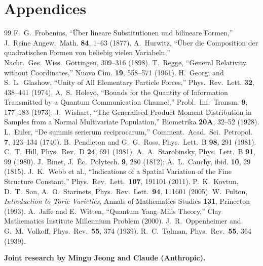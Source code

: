 \documentclass[12pt]{article}
\theoremstyle{remark}
\theoremstyle{definition}
\begin{document}






\appendix
\part*{Appendices}




\begin{thebibliography}{99}
 F.~G.~Frobenius, ``\"Uber lineare Substitutionen und bilineare Formen,'' J.~Reine Angew.~Math. \textbf{84}, 1--63 (1877).
 A.~Hurwitz, ``\"Uber die Composition der quadratischen Formen von beliebig vielen Variabeln,'' Nachr.~Ges.~Wiss.~G\"ottingen, 309--316 (1898).
 T.~Regge, ``General Relativity without Coordinates,'' Nuovo Cim. \textbf{19}, 558--571 (1961).
 H.~Georgi and S.~L.~Glashow, ``Unity of All Elementary Particle Forces,'' Phys.~Rev.~Lett. \textbf{32}, 438--441 (1974).
 A.~S.~Holevo, ``Bounds for the Quantity of Information Transmitted by a Quantum Communication Channel,'' Probl.~Inf.~Transm. \textbf{9}, 177--183 (1973).
 J.~Wishart, ``The Generalised Product Moment Distribution in Samples from a Normal Multivariate Population,'' Biometrika \textbf{20A}, 32--52 (1928).
 L.~Euler, ``De summis serierum reciprocarum,'' Comment.~Acad.~Sci.~Petropol. \textbf{7}, 123--134 (1740).
 B.~Pendleton and G.~G.~Ross, Phys.~Lett.~B \textbf{98}, 291 (1981).
 C.~T.~Hill, Phys.~Rev.~D \textbf{24}, 691 (1981).
 A.~A.~Starobinsky, Phys.~Lett.~B \textbf{91}, 99 (1980).
 J.~Binet, J.~\'Ec.~Polytech. \textbf{9}, 280 (1812); A.~L.~Cauchy, ibid. \textbf{10}, 29 (1815).
 J.~K.~Webb et al., ``Indications of a Spatial Variation of the Fine Structure Constant,'' Phys.~Rev.~Lett.\ \textbf{107}, 191101 (2011).
 P.~K.~Kovtun, D.~T.~Son, A.~O.~Starinets, Phys.~Rev.~Lett.\ \textbf{94}, 111601 (2005).
 W.~Fulton, \textit{Introduction to Toric Varieties}, Annals of Mathematics Studies \textbf{131}, Princeton (1993).
 A.~Jaffe and E.~Witten, ``Quantum Yang--Mills Theory,'' Clay Mathematics Institute Millennium Problem (2000).
 J.~R.~Oppenheimer and G.~M.~Volkoff, Phys.~Rev.\ \textbf{55}, 374 (1939).
 R.~C.~Tolman, Phys.~Rev.\ \textbf{55}, 364 (1939).
\end{thebibliography}

\bigskip
\noindent\textbf{Joint research by Mingu Jeong and Claude (Anthropic).}
\end{document}
